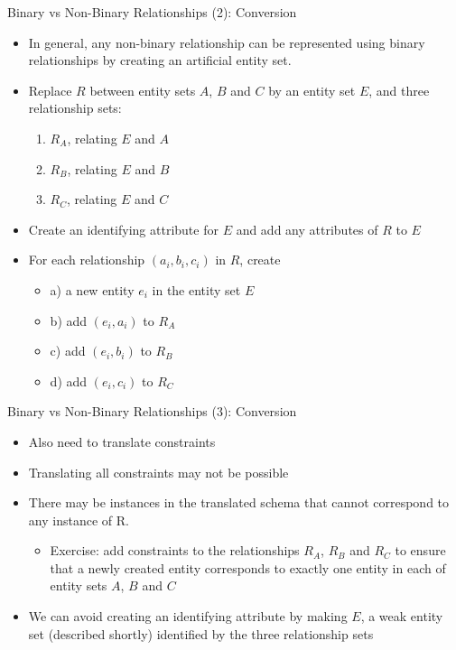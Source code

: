 \documentclass[aspectratio=169, xcolor=dvipsnames]{beamer}
\begin{document}
\begin{frame}{Binary vs Non-Binary Relationships (2): Conversion}
    \begin{itemize}[<+->]
        \item In general, any non-binary relationship can be represented using binary relationships by creating an artificial entity set.
        \item Replace $R$ between entity sets $A$, $B$ and $C$ by an entity set $E$, and three relationship sets:
        \begin{enumerate}
            \item $R_A$, relating $E$ and $A$
            \item $R_B$, relating $E$ and $B$
            \item $R_C$, relating $E$ and $C$
        \end{enumerate}
        \item Create an identifying attribute for $E$ and add any attributes of $R$ to $E$
        \item For each relationship $(a_i, b_i, c_i)$ in $R$, create
        \begin{itemize}
            \item[$\triangleright$] a) a new entity $e_i$ in the entity set $E$
            \item[$\triangleright$] b) add $(e_i, a_i)$ to $R_A$
            \item[$\triangleright$] c) add $(e_i, b_i)$ to $R_B$
            \item[$\triangleright$] d) add $(e_i, c_i)$ to $R_C$
        \end{itemize}
    \end{itemize}
\end{frame}

\begin{frame}{Binary vs Non-Binary Relationships (3): Conversion}
    \begin{itemize}[<+->]
        \item Also need to translate constraints
        \item Translating all constraints may not be possible
        \item There may be instances in the translated schema that cannot correspond to any instance of R.
        \begin{itemize}
            \item[$\triangleright$] Exercise: add constraints to the relationships $R_A$, $R_B$ and $R_C$ to ensure that a newly created entity corresponds to exactly one entity in each of entity sets $A$, $B$ and $C$
        \end{itemize}
        \item We can avoid creating an identifying attribute by making $E$, a weak entity set (described shortly) identified by the three relationship sets
    \end{itemize}
\end{frame}
\end{document}
